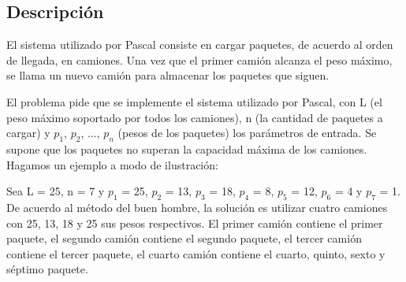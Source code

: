 \subsection{Descripci\'on}


El sistema utilizado por Pascal consiste en cargar paquetes, de acuerdo al orden de llegada, en camiones. Una vez que el primer cami\'on alcanza el peso m\'aximo, se llama un nuevo cami\'on para almacenar los paquetes que siguen.

El problema pide que se implemente el sistema utilizado por Pascal, con L (el peso m\'aximo soportado por todos los camiones), n (la cantidad de paquetes a cargar) y $p_1$, $p_2$, ..., $p_n$ (pesos de los paquetes) los par\'ametros de entrada.  Se supone que los paquetes no superan la capacidad m\'axima de los camiones.
Hagamos un ejemplo a modo de ilustraci\'on:

Sea L = 25, n = 7 y $p_1$ = 25, $p_2$ = 13, $p_3$ = 18, $p_4$ = 8, $p_5$ = 12, $p_6$ = 4 y $p_7$ = 1.
De acuerdo al m\'etodo del buen hombre, la soluci\'on es utilizar cuatro camiones con 25, 13, 18 y 25 sus pesos respectivos. El primer cami\'on contiene el primer paquete, el segundo cami\'on contiene el segundo paquete, el tercer cami\'on contiene el tercer paquete, el cuarto cami\'on contiene el cuarto, quinto, sexto y s\'eptimo paquete.

